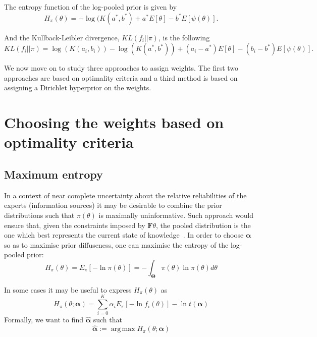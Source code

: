 \documentclass[a4paper, notitlepage, 11pt]{article}
\DeclareMathOperator*{\argmax}{arg\,max}
\begin{document}
The entropy function of the log-pooled prior is given by
\begin{equation}
\label{eq:entropypriorEF}
H_\pi(\theta) = - \log(K(a^*, b^*) + a^*  E[\theta]-  b^*  E[\psi(\theta)].
\end{equation}

And the Kullback-Leibler divergence, $KL(f_i || \pi)$, is the following
\begin{equation}
\label{eq:KLpriorEF}
KL(f_i || \pi) = \log( K(a_i,b_i)) - \log(K(a^*,b^*)) + (a_i - a^*) E[\theta] - (b_i - b^*) E[\psi(\theta)] .
\end{equation}

We now move on to study three approaches to assign weights. The first two approaches are based on optimality criteria and a third method is based on assigning a Dirichlet hyperprior on the weights.

\section*{Choosing the weights based on optimality criteria}
\subsection*{Maximum entropy}

In a context of near complete uncertainty about the relative reliabilities of the experts (information sources) it may be desirable to combine the prior distributions such that $\pi(\theta)$ is maximally uninformative. %
Such approach would ensure that, given the constraints imposed by $\mathbf{F}{\theta}$, the pooled distribution is the one which best represents the current state of knowledge~\citep{jaynes1957,savchuk1994}.
In order to choose $\boldsymbol\alpha$ so as to maximise prior 
diffuseness, one can maximise the entropy of the log-pooled prior:
\begin{equation}
\label{eq:entropypiA}
H_{\pi}(\theta) = E_{\pi}\left[-\ln\pi(\theta) \right] =-\int_{\boldsymbol\Theta}\pi(\theta)\ln\pi(\theta)d\theta 
\end{equation}

In some cases it may be useful to express $H_{\pi}(\theta)$ as
\begin{equation}
\label{eq:entropypiB}
 H_{\pi}(\theta; \boldsymbol\alpha) = \sum_{i=0}^{K} \alpha_i E_{\pi}[ - \ln f_i(\theta)] - \ln t(\boldsymbol\alpha)
\end{equation}
Formally, we want to find $\hat{\boldsymbol\alpha}$ such that
\begin{equation}
\label{eq:argmaxEnt}
 \hat{\boldsymbol\alpha}:= \argmax H_{\pi}(\theta; \boldsymbol\alpha)  
\end{equation}
\end{document}
